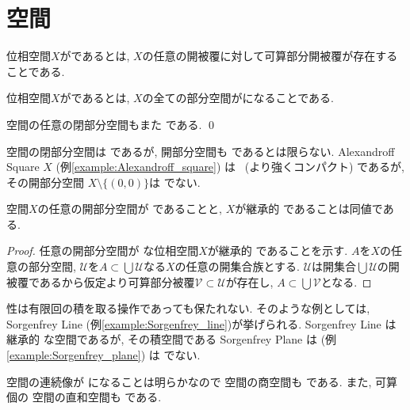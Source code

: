 \documentclass[uplatex, dvipdfmx, a4paper, 12pt, class=jsbook, crop=false]{standalone}
\begin{document}
\section{\Lindelof 空間}
\label{sec:Lindelof-spaces}

\begin{definition}
	位相空間$ X $が\indexe{\Lindelof}であるとは, $ X $の任意の開被覆に対して可算部分開被覆が存在することである.
\end{definition}

\begin{definition}
	位相空間$ X $がであるとは, $ X $の全ての部分空間が\Lindelof になることである.
\end{definition}

\begin{proposition}
	\label{prop:Every closed subspace of a Lindelof sapce is Lindelof}
	\Lindelof 空間の任意の閉部分空間もまた \Lindelof である. \qed
\end{proposition}

\Lindelof 空間の閉部分空間は \Lindelof であるが, 開部分空間も \Lindelof であるとは限らない. Alexandroff Square $ X $ (例\ref{example:Alexandroff_square}) は \Lindelof\ (より強くコンパクト) であるが, その開部分空間 $ X \setminus \{(0,0)\} $は \Lindelof でない.

\begin{proposition}
	\Lindelof 空間$ X $の任意の開部分空間が \Lindelof であることと, $ X $が継承的 \Lindelof であることは同値である.
\end{proposition}

\begin{proof}
	任意の開部分空間が \Lindelof な位相空間$ X $が継承的 \Lindelof であることを示す. $ A $を$ X $の任意の部分空間, $ \mathscr{U} $を$ A \subset \bigcup \mathscr{U} $なる$ X $の任意の開集合族とする. $ \mathscr{U} $は開集合$ \bigcup \mathscr{U} $の開被覆であるから仮定より可算部分被覆$ \mathscr{V} \subset \mathscr{U} $が存在し, $ A \subset \bigcup \mathscr{V} $となる.
\end{proof}


\Lindelof 性は有限回の積を取る操作であっても保たれない. そのような例としては, Sorgenfrey Line (例\ref{example:Sorgenfrey_line})が挙げられる. Sorgenfrey Line は継承的 \Lindelof な空間であるが, その積空間である Sorgenfrey Plane は (例\ref{example:Sorgenfrey_plane}) は \Lindelof でない.

\Lindelof 空間の連続像が \Lindelof になることは明らかなので \Lindelof 空間の商空間も \Lindelof である. また, 可算個の \Lindelof 空間の直和空間も \Lindelof である.
\end{document}
